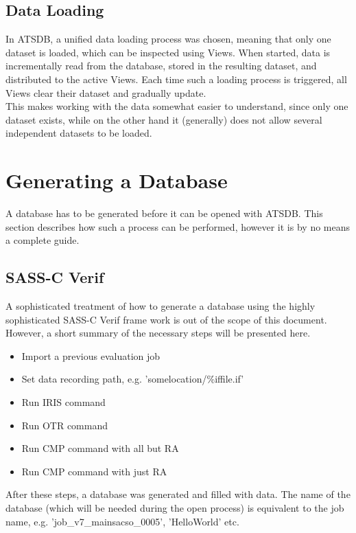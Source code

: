 \documentclass[10pt,letterpaper,extrafontsizes]{memoir}
\begin{document}
\subsection{Data Loading}
In ATSDB, a unified data loading process was chosen, meaning that only one dataset is loaded, which can be inspected using Views. When started, data is incrementally read from the database, stored in the resulting dataset, and distributed to the active Views. Each time such a loading process is triggered, all Views clear their dataset and gradually update. \\
This makes working with the data somewhat easier to understand, since only one dataset exists, while on the other hand it (generally) does not allow several independent datasets to be loaded.

\section{Generating a Database}
\label{sec:generation}

A database has to be generated before it can be opened with ATSDB.  This section describes how such
a process can be performed, however it is by no means a complete guide.

\subsection{SASS-C Verif}
A sophisticated treatment of how to generate a database using the highly sophisticated SASS-C Verif frame work  is  out  of  the  scope  of  this  document.   However,  a  short  summary  of  the  necessary  steps  will  be presented here.\\

\begin{itemize}  
\item Import a previous evaluation job
\item Set data recording path, e.g. 'somelocation/\%iffile.if'
\item Run IRIS command
\item Run OTR command
\item Run CMP command with all but RA
\item Run CMP command with just RA
\end{itemize}

After  these  steps,  a  database  was  generated  and  filled  with  data.   The  name  of  the  database  (which
will  be  needed  during  the  open  process)  is  equivalent  to  the  job  name,  e.g.   'job\_v7\_mainsacso\_0005', 'HelloWorld' etc. \\
\end{document}
